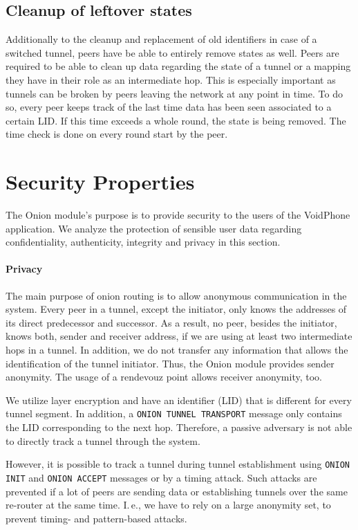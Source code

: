 \documentclass[paper=letter, fontsize=12pt]{article}
\begin{document}
\subsection{Cleanup of leftover states}
\label{sec:function:cleanup}
Additionally to the cleanup and replacement of old identifiers in case of a switched tunnel, peers have be able to entirely remove states as well. Peers are required to be able to clean up data regarding the state of a tunnel or a mapping they have in their role as an intermediate hop. This is especially important as tunnels can be broken by peers leaving the network at any point in time. To do so, every peer keeps track of the last time data has been seen associated to a certain LID. If this time exceeds a whole round, the state is being removed. The time check is done on every round start by the peer.

\section{Security Properties}
The Onion module's purpose is to provide security to the users of the VoidPhone application.
We analyze the protection of sensible user data regarding confidentiality, authenticity, integrity and privacy in this section.

\paragraph{Privacy}
The main purpose of onion routing is to allow anonymous communication in the system.
Every peer in a tunnel, except the initiator, only knows the addresses of its direct predecessor and successor.
As a result, no peer, besides the initiator, knows both, sender and receiver address, if we are using at least two intermediate hops in a tunnel.
In addition, we do not transfer any information that allows the identification of the tunnel initiator.
Thus, the Onion module provides sender anonymity.
The usage of a rendevouz point allows receiver anonymity, too.

We utilize layer encryption and have an identifier (LID) that is different for every tunnel segment.
In addition, a \texttt{ONION TUNNEL TRANSPORT} message only contains the LID corresponding to the next hop.
Therefore, a passive adversary is not able to directly track a tunnel through the system.

However, it is possible to track a tunnel during tunnel establishment using \texttt{ONION INIT} and \texttt{ONION ACCEPT} messages or by a timing attack.
Such attacks are prevented if a lot of peers are sending data or establishing tunnels over the same re-router at the same time.
I.\,e., we have to rely on a large anonymity set, to prevent timing- and pattern-based attacks.
\end{document}
